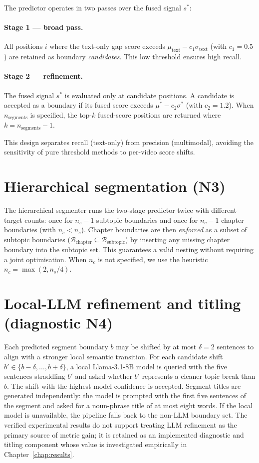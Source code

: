 The predictor operates in two passes over the fused signal $s^*$:

\paragraph{Stage 1 --- broad pass.}
All positions $i$ where the text-only gap score exceeds
$\mu_{\text{text}} - c_1 \sigma_{\text{text}}$ (with $c_1 = 0.5$) are
retained as boundary \emph{candidates}.
This low threshold ensures high recall.

\paragraph{Stage 2 --- refinement.}
The fused signal $s^*$ is evaluated only at candidate positions.
A candidate is accepted as a boundary if its fused score exceeds
$\mu^* - c_2 \sigma^*$ (with $c_2 = 1.2$).
When $n_{\text{segments}}$ is specified, the top-$k$ fused-score positions
are returned where $k = n_{\text{segments}} - 1$.

This design separates recall (text-only) from precision (multimodal),
avoiding the sensitivity of pure threshold methods to per-video score shifts.

\section{Hierarchical segmentation (N3)}
\label{sec:hierarchy}

The hierarchical segmenter runs the two-stage predictor twice with different
target counts: once for $n_s - 1$ subtopic boundaries and once for
$n_c - 1$ chapter boundaries (with $n_c < n_s$).
Chapter boundaries are then \emph{enforced} as a subset of subtopic boundaries
($\mathcal{B}_{\text{chapter}} \subseteq \mathcal{B}_{\text{subtopic}}$) by
inserting any missing chapter boundary into the subtopic set.
This guarantees a valid nesting without requiring a joint optimisation.
When $n_c$ is not specified, we use the heuristic $n_c = \max(2, n_s / 4)$.

\section{Local-LLM refinement and titling (diagnostic N4)}
\label{sec:refine}

Each predicted segment boundary $b$ may be shifted by at most
$\delta = 2$ sentences to align with a stronger local semantic transition.
For each candidate shift $b' \in \{b-\delta, \ldots, b+\delta\}$,
a local Llama-3.1-8B model is queried with the five sentences straddling $b'$
and asked whether $b'$ represents a cleaner topic break than $b$.
The shift with the highest model confidence is accepted.
Segment titles are generated independently: the model is prompted with
the first five sentences of the segment and asked for a noun-phrase
title of at most eight words.
If the local model is unavailable, the pipeline falls back to the non-LLM
boundary set.
The verified experimental results do not support treating LLM refinement as
the primary source of metric gain; it is retained as an implemented diagnostic
and titling component whose value is investigated empirically in
Chapter~\ref{chap:results}.

